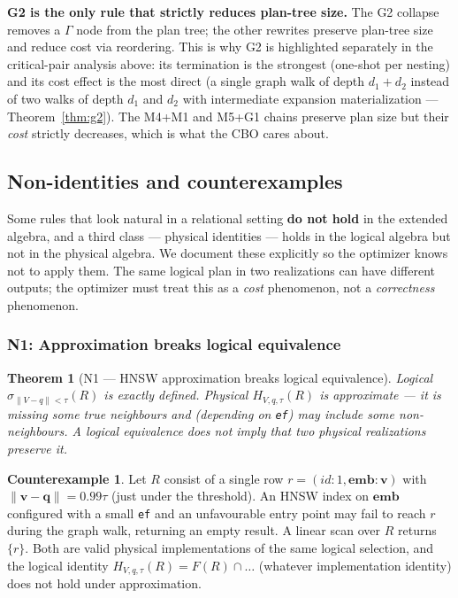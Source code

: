 \documentclass[sigconf,nonacm,review]{acmart}
\theoremstyle{plain}
\newtheorem{theorem}{Theorem}
\theoremstyle{definition}
\newtheorem{counterexample}{Counterexample}
\newcommand{\vect}[1]{\boldsymbol{#1}}
\theoremstyle{remark}
\begin{document}
\noindent\textbf{G2 is the only rule that strictly
reduces plan-tree size.}
The G2 collapse removes a $\Gamma$ node from the
plan tree; the other rewrites preserve plan-tree
size and reduce cost via reordering. This is why
G2 is highlighted separately in the critical-pair
analysis above: its termination is the strongest
(one-shot per nesting) and its cost effect is the
most direct (a single graph walk of depth
$d_1 + d_2$ instead of two walks of depth $d_1$ and
$d_2$ with intermediate expansion materialization
--- Theorem~\ref{thm:g2}). The M4+M1 and M5+G1
chains preserve plan size but their \emph{cost}
strictly decreases, which is what the CBO
cares about.

\subsection{Non-identities and counterexamples}\label{sec:equational:nonident}

Some rules that look natural in a relational setting \textbf{do not
hold} in the extended algebra, and a third class --- physical
identities --- holds in the logical algebra but not in the physical
algebra. We document these explicitly so the optimizer knows not to
apply them. The same logical plan in two realizations can have
different outputs; the optimizer must treat this as a
\emph{cost} phenomenon, not a \emph{correctness} phenomenon.

\subsubsection{N1: Approximation breaks logical equivalence}

\begin{theorem}[N1 --- HNSW approximation breaks logical equivalence]\label{thm:n1}
Logical $\sigma_{\lVert V-q\rVert<\tau}(R)$ is exactly defined.
Physical $H_{V, q, \tau}(R)$ is \emph{approximate} --- it is missing
some true neighbours and (depending on \texttt{ef}) may include some
non-neighbours. A logical equivalence does not imply that two
physical realizations preserve it.
\end{theorem}

\begin{counterexample}\label{ce:n1}
Let $R$ consist of a single row $r = (\mathit{id}: 1, \vect{emb}:
\vect{v})$ with $\lVert \vect{v} - \vect{q} \rVert = 0.99\tau$ (just
under the threshold). An HNSW index on $\vect{emb}$ configured with a
small \texttt{ef} and an unfavourable entry point may fail to reach
$r$ during the graph walk, returning an empty result. A linear scan
over $R$ returns $\{r\}$. Both are valid physical implementations of
the same logical selection, and the logical identity
$H_{V,q,\tau}(R) = F(R) \cap \ldots$ (whatever implementation
identity) does not hold under approximation.
\end{counterexample}
\end{document}
